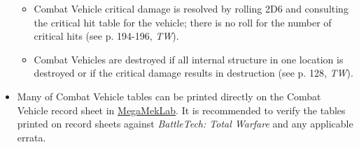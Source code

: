 \begin{itemize}
\begin{itemize}
    \item Combat Vehicle critical damage is resolved by rolling 2D6 and consulting the critical hit table for the vehicle; there is no roll for the number of critical hits (see p. 194-196, \emph{TW}).

    \item Combat Vehicles are destroyed if all internal structure in one location is destroyed or if the critical damage results in destruction (see p. 128, \emph{TW}).

  \end{itemize}

  \item Many of Combat Vehicle tables can be printed directly on the Combat Vehicle record sheet in \href{https://megamek.org}{MegaMekLab}.
        It is recommended to verify the tables printed on record sheets against \emph{BattleTech: Total Warfare} and any applicable errata.

\end{itemize}
